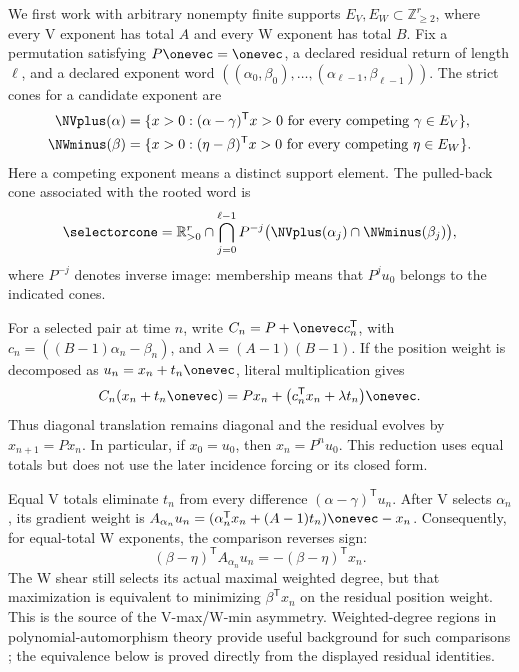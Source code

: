 \documentclass[11pt,letterpaper]{article}
\theoremstyle{definition}
\theoremstyle{remark}
\numberwithin{equation}{section}
\begin{document}
We first work with arbitrary nonempty finite supports
\(E_V,E_W\subset\mathbb Z_{\geq2}^{r}\), where every V exponent has total
\(A\) and every W exponent has total \(B\).  Fix a permutation satisfying
\(P\onevec=\onevec\), a declared residual return of length \(\ell\), and a
declared exponent word \(((\alpha_0,\beta_0),\ldots,
(\alpha_{\ell-1},\beta_{\ell-1}))\).  The strict cones for a candidate
exponent are
\begin{equation}
 \begin{aligned}
 \NVplus(\alpha)
  &=\{x>0:(\alpha-\gamma)^{\mathsf T}x>0
       \text{ for every competing }\gamma\in E_V\},\\
 \NWminus(\beta)
  &=\{x>0:(\eta-\beta)^{\mathsf T}x>0
       \text{ for every competing }\eta\in E_W\}.
 \end{aligned}
 \label{eq:normal-fans}
\end{equation}
Here a competing exponent means a distinct support element.  The pulled-back
cone associated with the rooted word is
\begin{equation}
 \selectorcone
 =\mathbb R_{>0}^{r}\cap
  \bigcap_{j=0}^{\ell-1}P^{-j}
  \bigl(\NVplus(\alpha_j)\cap\NWminus(\beta_j)\bigr),
 \label{eq:selector-cone}
\end{equation}
where \(P^{-j}\) denotes inverse image: membership means that
\(P^ju_0\) belongs to the indicated cones.

For a selected pair at time \(n\), write
\(C_n=P+\onevec c_n^{\mathsf T}\), with
\(c_n=((B-1)\alpha_n-\beta_n)\), and
\(\lambda=(A-1)(B-1)\).  If the position weight is decomposed as
\(u_n=x_n+t_n\onevec\), literal multiplication gives
\begin{equation}
 C_n(x_n+t_n\onevec)=Px_n+
 \bigl(c_n^{\mathsf T}x_n+\lambda t_n\bigr)\onevec.
 \label{eq:residual-step}
\end{equation}
Thus diagonal translation remains diagonal and the residual evolves by
\(x_{n+1}=Px_n\).  In particular, if \(x_0=u_0\), then
\(x_n=P^nu_0\).  This reduction uses equal totals but does not use the later
incidence forcing or its closed form.

Equal V totals eliminate \(t_n\) from every difference
\((\alpha-\gamma)^{\mathsf T}u_n\).  After V selects \(\alpha_n\), its
gradient weight is
\(A_{\alpha_n}u_n=(\alpha_n^{\mathsf T}x_n+(A-1)t_n)\onevec-x_n\).
Consequently, for equal-total W exponents, the comparison reverses sign:
\begin{equation}
 (\beta-\eta)^{\mathsf T}A_{\alpha_n}u_n
 =-(\beta-\eta)^{\mathsf T}x_n.
 \label{eq:w-sign-reversal}
\end{equation}
The W shear still selects its actual maximal weighted degree, but that
maximization is equivalent to minimizing \(\beta^{\mathsf T}x_n\) on the
residual position weight.  This is the source of the V-max/W-min asymmetry.
Weighted-degree regions in polynomial-automorphism theory provide useful
background for such comparisons
\citep{BlancVanSanten2022,MeunierPreliminary,ShaoSun2025}; the equivalence
below is proved directly from the displayed residual identities.
\end{document}
